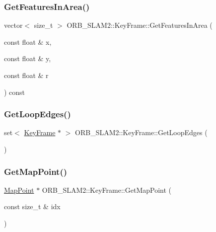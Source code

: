 \subsubsection{\texorpdfstring{Get\+Features\+In\+Area()}{GetFeaturesInArea()}}
{\footnotesize\ttfamily vector$<$ size\+\_\+t $>$ O\+R\+B\+\_\+\+S\+L\+A\+M2\+::\+Key\+Frame\+::\+Get\+Features\+In\+Area (\begin{DoxyParamCaption}\item[{const float \&}]{x,  }\item[{const float \&}]{y,  }\item[{const float \&}]{r }\end{DoxyParamCaption}) const}

\mbox{\label{class_o_r_b___s_l_a_m2_1_1_key_frame_ab3109e85b0ab224efdc23e51b5d2c3fa}} 
\subsubsection{\texorpdfstring{Get\+Loop\+Edges()}{GetLoopEdges()}}
{\footnotesize\ttfamily set$<$ \mbox{\hyperlink{class_o_r_b___s_l_a_m2_1_1_key_frame}{Key\+Frame}} $\ast$ $>$ O\+R\+B\+\_\+\+S\+L\+A\+M2\+::\+Key\+Frame\+::\+Get\+Loop\+Edges (\begin{DoxyParamCaption}{ }\end{DoxyParamCaption})}

\mbox{\label{class_o_r_b___s_l_a_m2_1_1_key_frame_ab85915f3e647334634d8a4d489c63ffd}} 
\subsubsection{\texorpdfstring{Get\+Map\+Point()}{GetMapPoint()}}
{\footnotesize\ttfamily \mbox{\hyperlink{class_o_r_b___s_l_a_m2_1_1_map_point}{Map\+Point}} $\ast$ O\+R\+B\+\_\+\+S\+L\+A\+M2\+::\+Key\+Frame\+::\+Get\+Map\+Point (\begin{DoxyParamCaption}\item[{const size\+\_\+t \&}]{idx }\end{DoxyParamCaption})}

